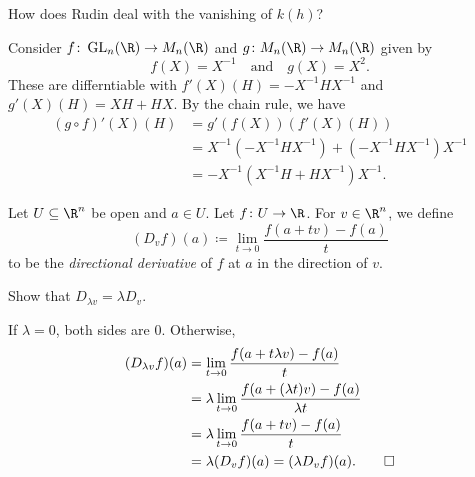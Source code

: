 How does Rudin deal with the vanishing of $k(h)$?
\begin{examples}
    \item Consider $f\colon \GL_n(\R) \to M_n(\R)$ and
    $g\colon M_n(\R) \to M_n(\R)$ given by \[
        f(X) = X^{-1} \quad \text{and} \quad g(X) = X^2.
    \] These are differntiable with $f'(X)(H) = -X^{-1}HX^{-1}$ and
    $g'(X)(H) = XH + HX$.
    By the chain rule, we have \begin{align*}
        (g \circ f)'(X)(H) &= g'(f(X))(f'(X)(H)) \\
        &= X^{-1}(-X^{-1}HX^{-1}) + (-X^{-1}HX^{-1})X^{-1} \\
        &= -X^{-1}(X^{-1}H + HX^{-1})X^{-1}.
    \end{align*} 
\end{examples}

\begin{definition} \label{def:dv}
    Let $U \subseteq \R^n$ be open and $a \in U$.
    Let $f\colon U \to \R$.
    For $v \in \R^n$, we define \[
        (D_v f)(a) \coloneq \lim_{t \to 0} \frac{f(a + tv) - f(a)}{t}
    \] to be the \emph{directional derivative} of $f$ at $a$
    in the direction of $v$.
\end{definition}

\begin{exercise}
    Show that $D_{\lambda v} = \lambda D_v$.
\end{exercise}
\begin{solution}
    If $\lambda = 0$, both sides are $0$.
    Otherwise, \begin{align*}
        (D_{\lambda v} f)(a)
            &= \lim_{t \to 0} \frac{f(a + t\lambda v) - f(a)}{t} \\
            &= \lambda \lim_{t \to 0} \frac{f(a + (\lambda t)v) - f(a)}
                                    {\lambda t} \\
            &= \lambda \lim_{t \to 0} \frac{f(a + tv) - f(a)}{t} \\
            &= \lambda (D_v f)(a) = (\lambda D_v f)(a). \qedhere
    \end{align*}
\end{solution}

